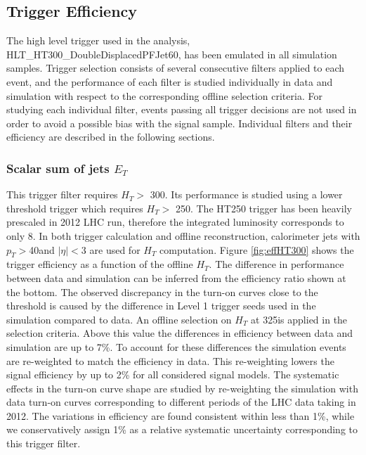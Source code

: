 \subsection{Trigger Efficiency}
\label{subsec:trigeff}

The high level trigger used in the analysis, HLT\_HT300\_DoubleDisplacedPFJet60, has been emulated in all
 simulation samples. Trigger selection consists of several consecutive filters applied to each event, 
and the performance of each filter is studied individually in data and simulation with respect to 
the corresponding offline selection criteria. For studying each individual filter, events 
passing all trigger decisions 
are not used in order to avoid a possible bias with the signal sample. Individual filters and their efficiency are
described in the following sections.  

\subsubsection{Scalar sum of jets $E_T$}
\label{subsubsec:trigHT}
This trigger filter requires $H_T > $ 300\GeV. Its performance is studied using a lower threshold trigger which 
requires $H_T >$ 250\GeV. 
The HT250 trigger has been heavily prescaled in 2012 LHC run, therefore the integrated luminosity corresponds to only 8\pbinv. 
In both trigger calculation and offline reconstruction, calorimeter jets with $p_T>$40\GeV and $|\eta|<$3 are used
 for $H_T$ computation. 
Figure \ref{fig:effHT300} shows the trigger efficiency as a function of the offline $H_T$. 
The difference in performance between data and simulation can be inferred from the efficiency ratio 
shown at the bottom. The observed discrepancy in the turn-on curves close to the threshold is caused by the 
difference in Level 1 trigger seeds used in the simulation compared to data.
An offline selection on 
$H_T$ at 325\GeV is applied in the selection criteria. 
Above this value the differences in efficiency between data and simulation are up to
7\%. To account for these differences the simulation events are re-weighted to match the efficiency in data.
This re-weighting
lowers the signal efficiency by up to 2\% for all considered signal models. The systematic effects in the turn-on
curve shape are studied by re-weighting the simulation with data turn-on curves corresponding to
 different periods of the LHC data taking in 2012. The variations in efficiency are found consistent within 
less than 1\%, while we conservatively assign 1\% as a relative 
systematic uncertainty corresponding to this trigger filter.      

